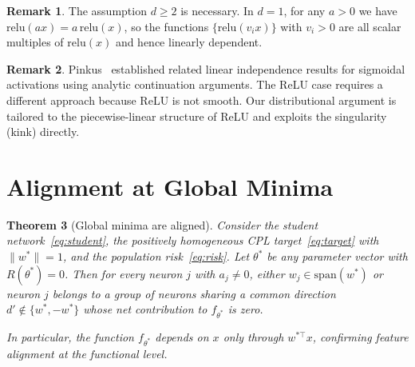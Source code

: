 \documentclass[11pt]{amsart}
\newtheorem{theorem}{Theorem}[section]
\theoremstyle{definition}
\newtheorem{remark}[theorem]{Remark}
\newcommand{\norm}[1]{\| #1 \|}
\newcommand{\relu}{\mathrm{relu}}
\newcommand{\spn}{\mathrm{span}}
\begin{document}
\begin{remark}\label{rem:d1}
The assumption $d \geq 2$ is necessary. In $d = 1$, for any $a > 0$ we have $\relu(ax) = a \, \relu(x)$, so the functions $\{\relu(v_i x)\}$ with $v_i > 0$ are all scalar multiples of $\relu(x)$ and hence linearly dependent.
\end{remark}

\begin{remark}\label{rem:pinkus}
Pinkus~\cite{pinkus1999} established related linear independence results for sigmoidal activations using analytic continuation arguments. The ReLU case requires a different approach because ReLU is not smooth. Our distributional argument is tailored to the piecewise-linear structure of ReLU and exploits the singularity (kink) directly.
\end{remark}

\section{Alignment at Global Minima}\label{sec:alignment}

\begin{theorem}[Global minima are aligned]\label{thm:alignment}
Consider the student network~\eqref{eq:student}, the positively homogeneous CPL target~\eqref{eq:target} with $\norm{w^*} = 1$, and the population risk~\eqref{eq:risk}. Let $\theta^*$ be any parameter vector with $R(\theta^*) = 0$. Then for every neuron $j$ with $a_j \neq 0$, either $w_j \in \spn(w^*)$ or neuron $j$ belongs to a group of neurons sharing a common direction $d' \notin \{w^*, -w^*\}$ whose net contribution to $f_{\theta^*}$ is zero.

In particular, the function $f_{\theta^*}$ depends on $x$ only through $w^{*\top}x$, confirming feature alignment at the functional level.
\end{theorem}
\end{document}
